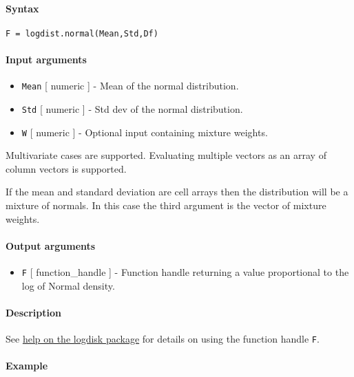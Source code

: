 


	\paragraph{Syntax}

\begin{verbatim}
F = logdist.normal(Mean,Std,Df)
\end{verbatim}

\paragraph{Input arguments}

\begin{itemize}
\item
  \texttt{Mean} {[} numeric {]} - Mean of the normal distribution.
\item
  \texttt{Std} {[} numeric {]} - Std dev of the normal distribution.
\item
  \texttt{W} {[} numeric {]} - Optional input containing mixture
  weights.
\end{itemize}

Multivariate cases are supported. Evaluating multiple vectors as an
array of column vectors is supported.

If the mean and standard deviation are cell arrays then the distribution
will be a mixture of normals. In this case the third argument is the
vector of mixture weights.

\paragraph{Output arguments}

\begin{itemize}
\itemsep1pt\parskip0pt
\item
  \texttt{F} {[} function\_handle {]} - Function handle returning a
  value proportional to the log of Normal density.
\end{itemize}

\paragraph{Description}

See \href{logdist/Contents}{help on the logdisk package} for details on
using the function handle \texttt{F}.

\paragraph{Example}


